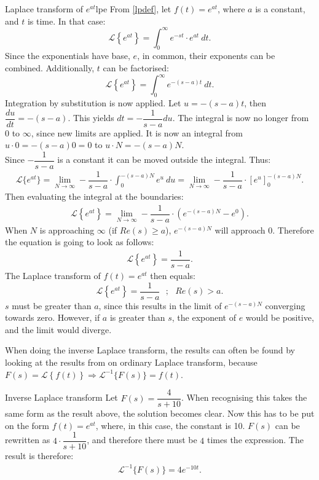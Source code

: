 \begin{example}{Laplace transform of $e^{at}$}{lpe}
From \cref{lpdef}, let $f(t)=e^{at}$, where $a$ is a constant, and $t$ is time. In that case:
$$\mathcal{L} \left\{e^{at} \right\}=\int_{0}^{\infty} e^{-st}\cdot e^{at}\ dt.$$
Since the exponentials have base, $e$, in common, their exponents can be combined. Additionally, $t$ can be factorised:
$$\mathcal{L} \left\{e^{at} \right\}=\int_{0}^{\infty} e^{-(s-a)t}\ dt.$$
Integration by substitution is now applied. Let $u = -(s-a)t$, then $\dfrac{du}{dt}=-(s-a)$. This yields $dt=-\dfrac{1}{s-a}du$. The integral is now no longer from 0 to $\infty$, since new limits are applied. It is now an integral from $u \cdot 0=-(s-a)0=0$ to $u\cdot N=-(s-a)N$.
\\
Since $-\dfrac{1}{s-a}$ is a constant it can be moved outside the integral. Thus:
\begin{align*}
\mathcal{L}\{e^{at}\}=\lim_{N \to \infty} -\dfrac{1}{s-a} \cdot \int_{0}^{-(s-a)N} e^{u} \ du = \lim_{N \to \infty} -\dfrac{1}{s-a} \cdot \left[e^{u} \right]_{0}^{-(s-a)N}.
\end{align*}
Then evaluating the integral at the boundaries:
\begin{align*}
\mathcal{L} \left\{e^{at} \right\} =\lim_{N \to \infty} -\dfrac{1}{s-a}\cdot (e^{-(s-a)N}-e^{0}).
\end{align*}
When $N$ is approaching $\infty$ (if $Re(s) \geq a$), $e^{-(s-a)N}$ will approach $0$. Therefore the equation is going to look as follows:
\begin{align*}
\mathcal{L} \left\{e^{at} \right\} = \dfrac{1}{s-a}.
\end{align*}
The Laplace transform of $f(t)=e^{at}$ then equals:
$$\mathcal{L} \left\{e^{at} \right\} =\dfrac{1}{s-a} \ \ \ ;\ \ \ Re(s)>a.$$
$s$ must be greater than $a$, since this results in the limit of $e^{-(s-a)N}$ converging towards zero. However, if $a$ is greater than $s$, the exponent of $e$ would be positive, and the limit would diverge.
\end{example}
\noindent When doing the inverse Laplace transform, the results can often be found by looking at the results from on ordinary Laplace transform, because $F(s) = \mathcal{L}\left\{f(t)\right\} \Rightarrow\mathcal{L}^{-1}\big\{ F(s)\big\} = f(t)$.
\\
\begin{example}{Inverse Laplace transform}{}
Let $F(s) = \dfrac{4}{s+10}$. When recognising this takes the same form as the result above, the solution becomes clear. Now this has to be put on the form $f(t)=e^{at}$, where, in this case, the constant is 10. $F(s)$ can be rewritten as $4 \cdot \dfrac{1}{s+10}$, and therefore there must be $4$ times the expression. The result is therefore:
\begin{align*}
\mathcal{L}^{-1} \big\{F(s) \big\} = 4e^{-10t}.
\end{align*}
\end{example}
